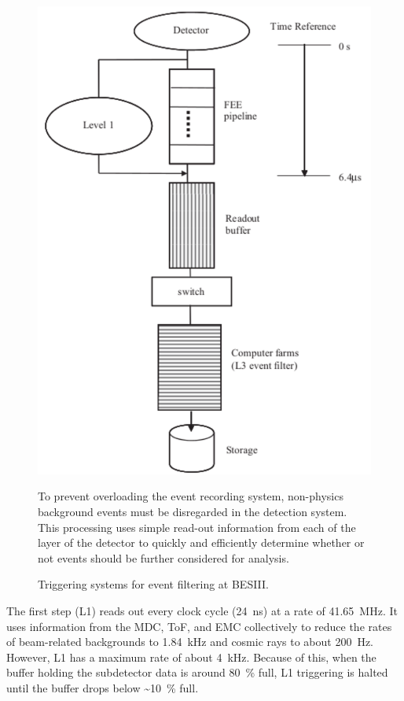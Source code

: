 \begin{figure}[H]
\centering
\includegraphics[scale=0.75]{figures/images/triggering.pdf}
\caption{Triggering systems for event filtering at BESIII.}
{To prevent overloading the event recording system, non-physics background events must be disregarded in the detection system.  This processing uses simple read-out information from each of the layer of the detector to quickly and efficiently determine whether or not events should be further considered for analysis.}
\label{fig:triggering}
\end{figure}

The first step (L1) reads out every clock cycle (\SI{24}{\ns}) at a rate of \SI{41.65}{\MHz}.
It uses information from the MDC, ToF, and EMC collectively to reduce the rates of beam-related backgrounds to \SI{1.84}{\kHz} and cosmic rays to about \SI{200}{\Hz}.
However, L1 has a maximum rate of about \SI{4}{\kHz}.
Because of this, when the buffer holding the subdetector data is around \SI{80}{\%} full, L1 triggering is halted until the buffer drops below \SI{~10}{\%} full.


